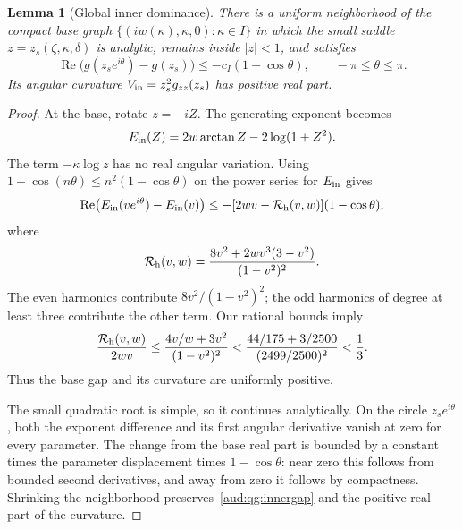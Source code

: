 \documentclass[11pt,a4paper]{article}
\numberwithin{equation}{section}
\newtheorem{lemma}[theorem]{Lemma}
\begin{document}
\begin{lemma}[Global inner dominance]\label{aud:qg:innerdominance}
There is a uniform neighborhood of the compact base graph
$\{(iw(\kappa),\kappa,0):\kappa\in I\}$ in which the small saddle $z=z_s(\zeta,\kappa,\delta)$ is analytic, remains inside $|z|<1$, and satisfies
\begin{equation}\label{aud:qg:innergap}
 \operatorname{Re}\bigl(g(z_se^{i\theta})-g(z_s)\bigr)
 \le-c_I(1-\cos\theta),\qquad -\pi\le\theta\le\pi.
\end{equation}
Its angular curvature $V_{\rm in}=z_s^2g_{zz}(z_s)$ has positive real part.
\end{lemma}
\begin{proof}
At the base, rotate $z=-iZ$. The generating exponent becomes
\[
 E_{\rm in}(Z)=2w\arctan Z-2\log(1+Z^2).
\]
The term $-\kappa\log z$ has no real angular variation. Using
$1-\cos(n\theta)\le n^2(1-\cos\theta)$ on the power series for $E_{\rm in}$ gives
\begin{equation}\label{aud:qg:harmonic}
 \operatorname{Re}\bigl(E_{\rm in}(ve^{i\theta})-E_{\rm in}(v)\bigr)
 \le-[2wv-\mathcal R_{\rm h}(v,w)](1-\cos\theta),
\end{equation}
where
\[
 \mathcal R_{\rm h}(v,w)=\frac{8v^2+2wv^3(3-v^2)}{(1-v^2)^2}.
\]
The even harmonics contribute $8v^2/(1-v^2)^2$; the odd harmonics of degree at least three contribute the other term. Our rational bounds imply
\[
 \frac{\mathcal R_{\rm h}(v,w)}{2wv}
 \le\frac{4v/w+3v^2}{(1-v^2)^2}
 <\frac{44/175+3/2500}{(2499/2500)^2}<\frac13.
\]
Thus the base gap and its curvature are uniformly positive.

The small quadratic root is simple, so it continues analytically. On the circle $z_se^{i\theta}$, both the exponent difference and its first angular derivative vanish at zero for every parameter. The change from the base real part is bounded by a constant times the parameter displacement times $1-\cos\theta$: near zero this follows from bounded second derivatives, and away from zero it follows by compactness. Shrinking the neighborhood preserves~\eqref{aud:qg:innergap} and the positive real part of the curvature.
\end{proof}
\end{document}
